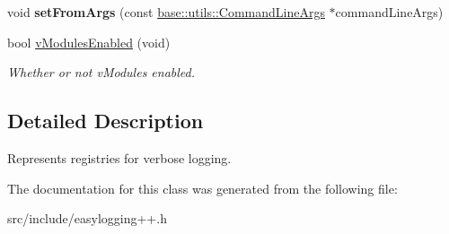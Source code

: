 \begin{DoxyCompactItemize}
void {\bfseries set\+From\+Args} (const \hyperlink{classel_1_1base_1_1utils_1_1_command_line_args}{base\+::utils\+::\+Command\+Line\+Args} $\ast$command\+Line\+Args)
\item 
\mbox{\label{classel_1_1base_1_1_v_registry_ad7a8e939daf6b3d6b949def0a9f65a1f}} 
bool \hyperlink{classel_1_1base_1_1_v_registry_ad7a8e939daf6b3d6b949def0a9f65a1f}{v\+Modules\+Enabled} (void)
\begin{DoxyCompactList}\small\item\em Whether or not v\+Modules enabled. \end{DoxyCompactList}\end{DoxyCompactItemize}


\subsection{Detailed Description}
Represents registries for verbose logging. 

The documentation for this class was generated from the following file\+:\begin{DoxyCompactItemize}
\item 
src/include/easylogging++.\+h\end{DoxyCompactItemize}

